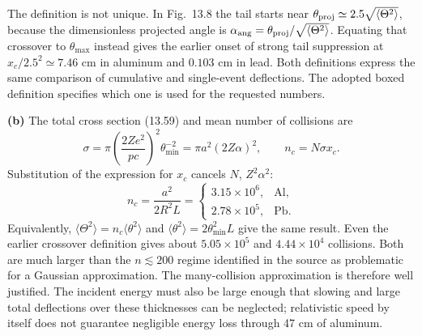 The definition is not unique. In Fig.~13.8 the tail starts near
$\theta_{\rm proj}\simeq2.5\sqrt{\langle\Theta^2\rangle}$, because
the dimensionless projected angle is
$\alpha_{\rm ang}=\theta_{\rm proj}/\sqrt{\langle\Theta^2\rangle}$.
Equating that crossover to $\theta_{\max}$ instead gives the earlier
onset of strong tail suppression at
$x_c/2.5^2\simeq7.46$ cm in aluminum and $0.103$ cm in lead.
Both definitions express the same comparison of cumulative and
single-event deflections. The adopted boxed definition specifies which
one is used for the requested numbers.

\textbf{(b)} The total cross section (13.59) and mean number of
collisions are
\[
 \sigma=\pi\left(\frac{2Ze^2}{pc}\right)^2\theta_{\min}^{-2}
       =\pi a^2(2Z\alpha)^2,\qquad
 n_c=N\sigma x_c.
\]
Substitution of the expression for $x_c$ cancels $N$, $Z^2\alpha^2$:
\[
 \boxed{n_c=\frac{a^2}{2R^2L}
 =\begin{cases}
 3.15\times10^6,&\text{Al},\\
 2.78\times10^5,&\text{Pb}.
 \end{cases}}
\]
Equivalently, $\langle\Theta^2\rangle=n_c\langle\theta^2\rangle$
and $\langle\theta^2\rangle=2\theta_{\min}^2L$ give the same result.
Even the earlier crossover definition gives about $5.05\times10^5$
and $4.44\times10^4$ collisions. Both are much larger than the
$n\lesssim200$ regime identified in the source as problematic for a
Gaussian approximation. The many-collision approximation is therefore
well justified. The incident energy must also be large enough that
slowing and large total deflections over these thicknesses can be
neglected; relativistic speed by itself does not guarantee negligible
energy loss through 47 cm of aluminum.







